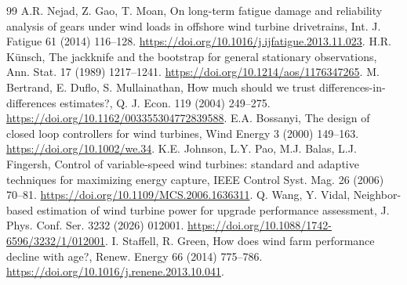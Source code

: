 \documentclass[preprint,12pt]{elsarticle}
\begin{document}
\begin{thebibliography}{99}
 A.R. Nejad, Z. Gao, T. Moan, On long-term fatigue damage and reliability analysis of gears under wind loads in offshore wind turbine drivetrains, Int. J. Fatigue 61 (2014) 116--128. \url{https://doi.org/10.1016/j.ijfatigue.2013.11.023}.
 H.R. Künsch, The jackknife and the bootstrap for general stationary observations, Ann. Stat. 17 (1989) 1217--1241. \url{https://doi.org/10.1214/aos/1176347265}.
 M. Bertrand, E. Duflo, S. Mullainathan, How much should we trust differences-in-differences estimates?, Q. J. Econ. 119 (2004) 249--275. \url{https://doi.org/10.1162/003355304772839588}.
 E.A. Bossanyi, The design of closed loop controllers for wind turbines, Wind Energy 3 (2000) 149--163. \url{https://doi.org/10.1002/we.34}.
 K.E. Johnson, L.Y. Pao, M.J. Balas, L.J. Fingersh, Control of variable-speed wind turbines: standard and adaptive techniques for maximizing energy capture, IEEE Control Syst. Mag. 26 (2006) 70--81. \url{https://doi.org/10.1109/MCS.2006.1636311}.
 Q. Wang, Y. Vidal, Neighbor-based estimation of wind turbine power for upgrade performance assessment, J. Phys. Conf. Ser. 3232 (2026) 012001. \url{https://doi.org/10.1088/1742-6596/3232/1/012001}.
 I. Staffell, R. Green, How does wind farm performance decline with age?, Renew. Energy 66 (2014) 775--786. \url{https://doi.org/10.1016/j.renene.2013.10.041}.
\end{thebibliography}
\end{document}
